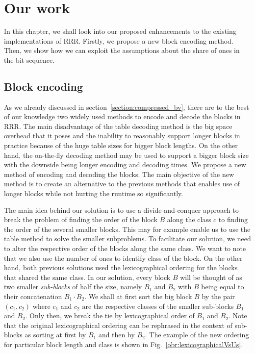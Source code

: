 \chapter{Our work}
\label{kap:kap3}

In this chapter, we shall look into our proposed enhancements to the existing
implementations of RRR. Firstly, we propose a new block encoding method.
Then, we show how we can exploit the assumptions about the share of ones
in the bit sequence.

\section{Block encoding}

As we already discussed in section~\ref{section:compressed_bv}, there are to
the best of our knowledge two widely used methods to encode and decode the
blocks in RRR. The main disadvantage of the table decoding method is the big space
overhead that it poses and the inability to reasonably support longer blocks
in practice because of the huge table sizes for bigger block lengths. On the
other hand, the on-the-fly decoding method may be used to support a bigger block size
with the downside being longer encoding and decoding times. We propose a
new method of encoding and decoding the blocks. The main objective of the new method is
to create an alternative to the previous methods that enables use of longer blocks
while not hurting the runtime so significantly.

The main idea behind our solution is to use a divide-and-conquer approach to break
the problem of finding the order of the block $B$ along the class $c$ to finding the order
of the several smaller blocks. This may for example enable us to use the table method to solve the
smaller subproblems. To facilitate our solution, we need to alter the respective order of
the blocks along the same class. We want to note that we also use the number of ones to
identify class of the block. On the other hand, both previous solutions used the lexicographical ordering
for the blocks that shared the same class. In our solution, every block $B$ will be thought
of as two smaller \textit{sub-blocks} of half the size, namely $B_1$ and $B_2$ with $B$ being equal to their
concatenation $B_1\cdot B_2$. We shall at first sort the big block $B$ by the pair $(c_1, c_2)$
where $c_1$ and $c_2$ are the respective classes of the smaller sub-blocks $B_1$ and $B_2$. Only then,
we break the tie by lexicographical order of $B_1$ and $B_2$. Note that the original lexicographical
ordering can be rephrased in the context of sub-blocks as sorting at first by $B_1$ and then by
$B_2$. The example of the new ordering for particular block length and class is shown in
Fig.~\ref{obr:lexicographicalVsUs}.

